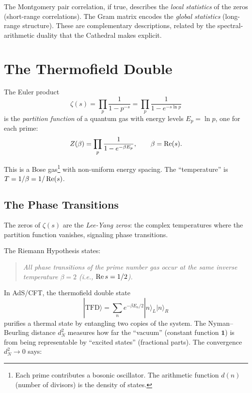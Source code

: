 \documentclass[11pt,a4paper]{article}
\begin{document}
\begin{remark}
The Montgomery pair correlation, if true, describes the
\emph{local statistics} of the zeros (short-range correlations).
The Gram matrix encodes the \emph{global statistics} (long-range
structure). These are complementary descriptions, related by the
spectral-arithmetic duality that the Cathedral makes explicit.
\end{remark}

\section{The Thermofield Double}
\label{sec:thermofield}

The Euler product
\[
  \zeta(s) = \prod_p \frac{1}{1 - p^{-s}}
  = \prod_p \frac{1}{1 - e^{-s \ln p}}
\]
is the \emph{partition function} of a quantum gas with energy levels
$E_p = \ln p$, one for each prime:
\[
  Z(\beta) = \prod_p \frac{1}{1 - e^{-\beta E_p}}, \qquad
  \beta = \operatorname{Re}(s).
\]

This is a Bose gas\footnote{Each prime contributes a bosonic
oscillator. The arithmetic function $d(n)$ (number of divisors)
is the density of states.} with non-uniform energy spacing.
The ``temperature'' is $T = 1/\beta = 1/\operatorname{Re}(s)$.

\subsection{The Phase Transitions}

The zeros of $\zeta(s)$ are the \emph{Lee-Yang zeros}: the complex
temperatures where the partition function vanishes, signaling phase
transitions.

\begin{principle}
The Riemann Hypothesis states:
\begin{quote}
\emph{All phase transitions of the prime number gas occur at the
same inverse temperature $\beta = 2$ (i.e., $\operatorname{Re} s = 1/2$).}
\end{quote}
\end{principle}

In AdS/CFT, the thermofield double state
\[
  |\mathrm{TFD}\rangle = \sum_n e^{-\beta E_n / 2} |n\rangle_L |n\rangle_R
\]
purifies a thermal state by entangling two copies of the system.
The Nyman--Beurling distance $d_N^2$ measures how far the
``vacuum'' (constant function $\mathbf{1}$) is from being
representable by ``excited states'' (fractional parts).
The convergence $d_N^2 \to 0$ says:
\end{document}
